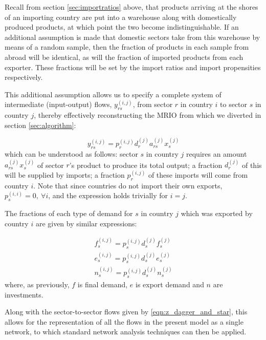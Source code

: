 \documentclass{article}
\begin{document}
Recall from section \ref{sec:importratios} above, that products arriving at the shores of an importing country are put into a warehouse along with domestically produced products, at which point the two become indistinguishable.
If an additional assumption is made that domestic sectors take from this warehouse by means of a random sample, then the fraction of products in each sample from abroad will be identical, as will the fraction of imported products from each exporter.
These fractions will be set by the import ratios and import propensities respectively.

This additional assumption allows us to specify a complete system of intermediate (input-output) flows, $y_{rs}^{(i,j)}$, from sector $r$ in country $i$ to sector $s$ in country $j$, thereby effectively reconstructing the MRIO from which we diverted in section \ref{sec:algorithm}:

\begin{equation}\label{eqn:y_rsij}
    y_{rs}^{(i,j)} = p_{r}^{(i,j)} d_{r}^{(j)} a_{rs}^{(j)} x_{s}^{(j)}
\end{equation}
which can be understood as follows:
sector $s$ in country $j$ requires an amount $a_{rs}^{(j)} x_{s}^{(j)}$ of sector $r$'s product to produce its total output;
a fraction $d_{r}^{(j)}$ of this will be supplied by imports;
a fraction $p_{r}^{(i,j)}$ of these imports will come from country $i$. Note that since countries do not import their own exports, $p_s^{(i,i)}=0,\ \forall i$, and the expression holds trivially for $i=j$.

The fractions of each type of demand for $s$ in country $j$ which was exported by country $i$ are given by similar expressions:

\begin{equation}\label{eqn:f_e_n_unified_network}
    \begin{aligned}
        f_{s}^{(i,j)} = p_{s}^{(i,j)} d_{s}^{(j)} f_{s}^{(j)} \\
        e_{s}^{(i,j)} = p_{s}^{(i,j)} d_{s}^{(j)} e_{s}^{(j)} \\
        n_{s}^{(i,j)} = p_{s}^{(i,j)} d_{s}^{(j)} n_{s}^{(j)}
    \end{aligned}
\end{equation}
where, as previously, $f$ is final demand, $e$ is export demand and $n$ are investments.

Along with the sector-to-sector flows given by \cref{eqn:z_dagger_and_star}, this allows for the representation of all the flows in the present model as a single network, to which standard network analysis techniques can then be applied.
\end{document}
